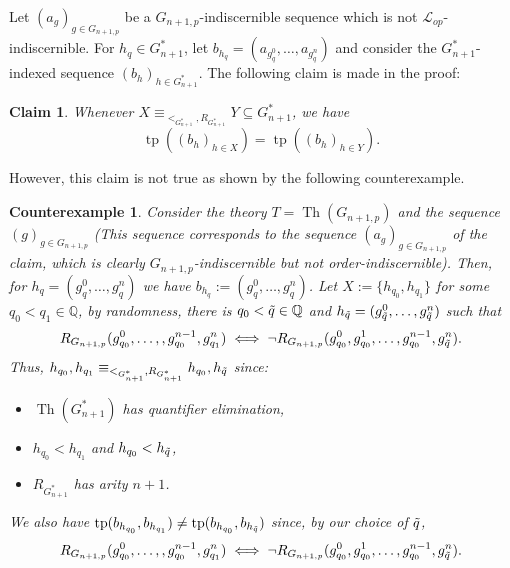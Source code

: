 \documentclass{amsart}
\newtheorem*{claim}{Claim}
\newtheorem{counterexample}[teor]{Counterexample}
\newtheorem{external claim}[teor]{Claim}
\newcommand{\mL}{\mathcal{L}}
\DeclareMathOperator{\tp}{{tp}}
\DeclareMathOperator{\Th}{{Th}}
\begin{document}
Let $(a_g)_{g\in G_{n+1,p}}$ be a $G_{n+1,p}$-indiscernible sequence which is not $\mL_{op}$-indiscernible. For $h_q\in G^*_{n+1}$, let $b_{h_q}=( a_{g^0_q},\dots, a_{g^n_q} )$ and consider the $G^*_{n+1}$-indexed sequence $(b_h)_{h\in G^*_{n+1}}$. The following claim is made in the proof:
\begin{claim}
    Whenever $X\equiv_{<_{G^*_{n+1}},R_{G^*_{n+1}}}Y \subseteq G^*_{n+1}$, we have $$ \tp( (b_h)_{h\in X} )=\tp((b_h)_{h\in Y}) .$$
\end{claim}
However, this claim is not true as shown by the following counterexample. 
\begin{counterexample}\label{counterexample}
    Consider the theory $T=\Th(G_{n+1,p})$ and the sequence $(g)_{g\in G_{n+1,p}}$ (This sequence corresponds to the sequence $(a_g)_{g\in G_{n+1,p}}$ of the claim, which is clearly $G_{n+1,p}$-indiscernible but not order-indiscernible). Then, for $h_q=(g^0_q,\dots, g^n_q)$ we have $b_{h_q}:=(g^0_q,\dots,g^n_q)$. Let $X:=\{h_{q_0},h_{q_1} \}$ for some $q_0<q_1\in \mathbb{Q}$, by randomness, there is $q_0<\Tilde{q}\in \mathbb{Q}$ and $h_{\Tilde{q}}=(g^0_{\Tilde{q}},\dots,g^n_{\Tilde{q}})$ such that $$ R_{ G_{n+1,p}}(g^0_{q_0},\dots, ,g^{n-1}_{q_0}, g^n_{q_1})\iff \neg  R_{ G_{n+1,p}}(g^0_{q_0},g^1_{q_0},\dots,g^{n-1}_{q_0}, g^n_{\Tilde{q}}).$$
Thus, $h_{q_0},h_{q_1}\equiv_{<_{G^*_{n+1}},R_{G^*_{n+1}}}  h_{q_0},h_{\Tilde{q}}$ since: \begin{itemize}
    \item $\Th(G^*_{n+1})$ has quantifier elimination,
    \item $h_{q_0}<h_{q_1}$ and $h_{q_0}<h_{\Tilde{q}}$,
    \item $R_{G^*_{n+1}}$ has arity $n+1$.%
\end{itemize}

We also have $\tp(b_{h_{q_0}},b_{h_{q_1}})\neq \tp(b_{h_{q_0}},b_{h_{\Tilde{q}}})$ since, by our choice of $\Tilde{q}$, $$ R_{ G_{n+1,p}}(g^0_{q_0},\dots, ,g^{n-1}_{q_0}, g^n_{q_1})\iff \neg  R_{ G_{n+1,p}}(g^0_{q_0},g^1_{q_0},\dots,g^{n-1}_{q_0}, g^n_{\Tilde{q}}).$$
\end{counterexample}
\end{document}
